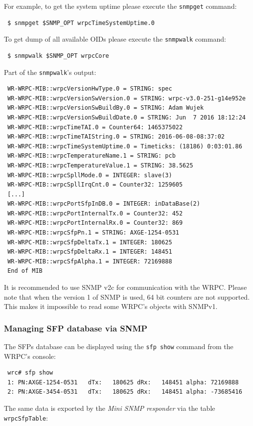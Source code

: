 \documentclass[a4paper, 12pt]{article}
\newcommand{\codeHook}[1]{\mbox{\ttfamily\MakeTextUppercase{#1}}}
\begin{document}
For example, to get the system uptime please execute the \texttt{snmpget} command:
\begin{lstlisting}
 $ snmpget $SNMP_OPT wrpcTimeSystemUptime.0
\end{lstlisting}
To get dump of all available OIDs please execute the \texttt{snmpwalk} command:
\begin{lstlisting}
 $ snmpwalk $SNMP_OPT wrpcCore
\end{lstlisting}
Part of the \texttt{snmpwalk}'s output:
\begin{lstlisting}
 WR-WRPC-MIB::wrpcVersionHwType.0 = STRING: spec
 WR-WRPC-MIB::wrpcVersionSwVersion.0 = STRING: wrpc-v3.0-251-g14e952e
 WR-WRPC-MIB::wrpcVersionSwBuildBy.0 = STRING: Adam Wujek
 WR-WRPC-MIB::wrpcVersionSwBuildDate.0 = STRING: Jun  7 2016 18:12:24
 WR-WRPC-MIB::wrpcTimeTAI.0 = Counter64: 1465375022
 WR-WRPC-MIB::wrpcTimeTAIString.0 = STRING: 2016-06-08-08:37:02
 WR-WRPC-MIB::wrpcTimeSystemUptime.0 = Timeticks: (18186) 0:03:01.86
 WR-WRPC-MIB::wrpcTemperatureName.1 = STRING: pcb
 WR-WRPC-MIB::wrpcTemperatureValue.1 = STRING: 38.5625
 WR-WRPC-MIB::wrpcSpllMode.0 = INTEGER: slave(3)
 WR-WRPC-MIB::wrpcSpllIrqCnt.0 = Counter32: 1259605
 [...]
 WR-WRPC-MIB::wrpcPortSfpInDB.0 = INTEGER: inDataBase(2)
 WR-WRPC-MIB::wrpcPortInternalTx.0 = Counter32: 452
 WR-WRPC-MIB::wrpcPortInternalRx.0 = Counter32: 869
 WR-WRPC-MIB::wrpcSfpPn.1 = STRING: AXGE-1254-0531
 WR-WRPC-MIB::wrpcSfpDeltaTx.1 = INTEGER: 180625
 WR-WRPC-MIB::wrpcSfpDeltaRx.1 = INTEGER: 148451
 WR-WRPC-MIB::wrpcSfpAlpha.1 = INTEGER: 72169888
 End of MIB
\end{lstlisting}

It is recommended to use SNMP v2c for communication with the \codeHook{wrpc}.
Please note that when the version 1 of SNMP is used, 64 bit counters are not
supported. This makes it impossible to read some \codeHook{wrpc}'s objects with
SNMPv1.

\subsubsection{Managing SFP database via SNMP}
\label{Managing SFP database via SNMP}

The SFPs database can be displayed using the \texttt{sfp show} command from
the \codeHook{wrpc}'s console:
\begin{lstlisting}
 wrc# sfp show
 1: PN:AXGE-1254-0531   dTx:   180625 dRx:   148451 alpha: 72169888
 2: PN:AXGE-3454-0531   dTx:   180625 dRx:   148451 alpha: -73685416
\end{lstlisting}
The same data is exported by the \textit{Mini SNMP responder} via the table
\texttt{wrpcSfpTable}:
\end{document}
